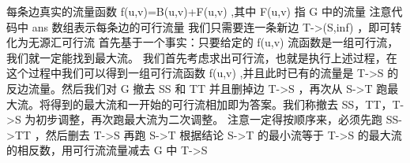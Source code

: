 {}每条边真实的流量函数\markdownRendererDollarSign{} f(u,v)=B(u,v)+F(u,v) \markdownRendererDollarSign{},其中\markdownRendererDollarSign{} F(u,v) \markdownRendererDollarSign{}指\markdownRendererDollarSign{} G \markdownRendererDollarSign{}中的流量\markdownRendererInterblockSeparator
{}\markdownRendererInterblockSeparator
{}注意代码中\markdownRendererDollarSign{} ans \markdownRendererDollarSign{}数组表示每条边的可行流量\markdownRendererInterblockSeparator
{}
\markdownRendererSectionEnd \markdownRendererSectionBegin
{}\markdownRendererInterblockSeparator
{}我们只需要连一条新边\markdownRendererDollarSign{} T->(S,inf) \markdownRendererDollarSign{}，即可转化为无源汇可行流\markdownRendererInterblockSeparator
{}
\markdownRendererSectionEnd \markdownRendererSectionBegin
{}\markdownRendererInterblockSeparator
{}首先基于一个事实：只要给定的\markdownRendererDollarSign{} f(u,v) \markdownRendererDollarSign{}流函数是一组可行流，我们就一定能找到最大流。\markdownRendererParagraphSeparator
{}我们首先考虑求出可行流，也就是执行上述过程，在这个过程中我们可以得到一组可行流函数\markdownRendererDollarSign{} f(u,v) \markdownRendererDollarSign{},并且此时已有的流量是\markdownRendererDollarSign{} T->S \markdownRendererDollarSign{}的反边流量。然后我们对\markdownRendererDollarSign{} G \markdownRendererDollarSign{}撤去\markdownRendererDollarSign{} SS \markdownRendererDollarSign{}和\markdownRendererDollarSign{} TT \markdownRendererDollarSign{}并且删掉边\markdownRendererDollarSign{} T->S \markdownRendererDollarSign{}，再次从\markdownRendererDollarSign{} S->T \markdownRendererDollarSign{}跑最大流。将得到的最大流和一开始的可行流相加即为答案。我们称撤去\markdownRendererDollarSign{} SS，TT，T->S \markdownRendererDollarSign{}为初步调整，再次跑最大流为二次调整。\markdownRendererParagraphSeparator
{}注意一定得按顺序来，必须先跑\markdownRendererDollarSign{} SS->TT \markdownRendererDollarSign{}，然后删去\markdownRendererDollarSign{} T->S \markdownRendererDollarSign{}再跑\markdownRendererDollarSign{} S->T \markdownRendererDollarSign{}\markdownRendererInterblockSeparator
{}\markdownRendererInterblockSeparator
{}
\markdownRendererSectionEnd \markdownRendererSectionBegin
{}\markdownRendererInterblockSeparator
{}根据结论 \markdownRendererDollarSign{} S->T \markdownRendererDollarSign{}的最小流等于\markdownRendererDollarSign{} T->S \markdownRendererDollarSign{}的最大流的相反数，用可行流流量减去\markdownRendererDollarSign{} G \markdownRendererDollarSign{}中\markdownRendererDollarSign{} T->S\markdownRendererSoftLineBreak
